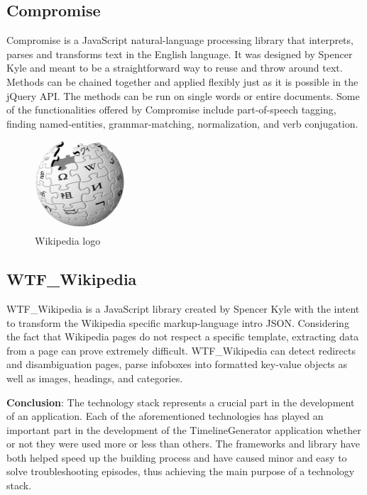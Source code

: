 \documentclass{report}
\begin{document}
\subsection {Compromise}
Compromise is a JavaScript natural-language processing library that interprets, parses and transforms text in the English language. It was designed by Spencer Kyle and meant to be a straightforward way to reuse and throw around text. Methods can be chained together and applied flexibly just as it is possible in the jQuery API. The methods can be run on single words or entire documents. Some of the functionalities offered by Compromise include part-of-speech tagging, finding named-entities, grammar-matching, normalization, and verb conjugation. 

\begin{figure}
	\vspace*{-1.5cm}
    \centering
    \includegraphics[width=0.3\textwidth]{wiki}
	\caption{Wikipedia logo}
	\vspace{-10pt} 
\end{figure}
\subsection {WTF\_Wikipedia}
WTF\_Wikipedia is a JavaScript library created by Spencer Kyle with the intent to transform the Wikipedia specific markup-language intro JSON. Considering the fact that Wikipedia pages do not respect a specific template, extracting data from a page can prove extremely difficult. WTF\_Wikipedia can detect redirects and disambiguation pages, parse infoboxes into formatted key-value objects as well as images, headings, and categories.

\textbf{Conclusion}: The technology stack represents a crucial part in the development of an application. Each of the aforementioned technologies has played an important part in the development of the TimelineGenerator application whether or not they were used more or less than others. The frameworks and library have both helped speed up the building process and have caused minor and easy to solve troubleshooting episodes, thus achieving the main purpose of a technology stack.
\end{document}
